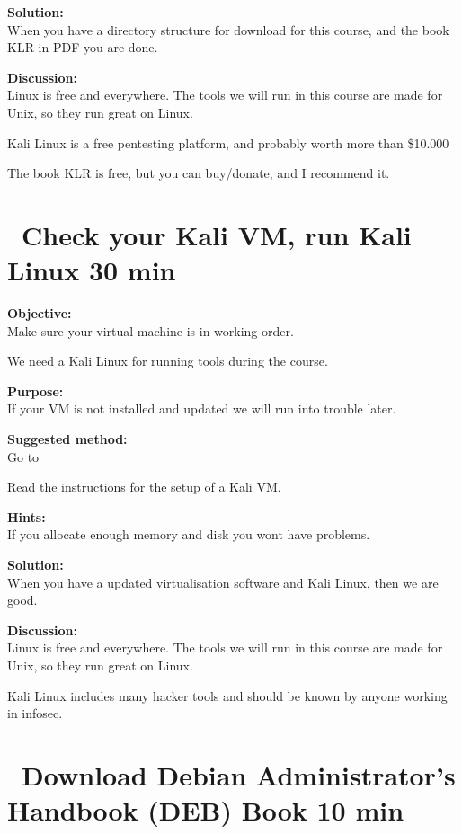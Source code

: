 \documentclass[a4paper,11pt,notitlepage]{report}
\begin{document}
{\bf Solution:}\\
When you have a directory structure for download for this course, and the book KLR in PDF you are done.

{\bf Discussion:}\\
Linux is free and everywhere. The tools we will run in this course are made for Unix, so they run great on Linux.

Kali Linux is a free pentesting platform, and probably worth more than \$10.000

The book KLR is free, but you can buy/donate, and I recommend it.

\chapter{\faExclamationTriangle\ Check your Kali VM, run Kali Linux 30 min}
\label{ex:basicKaliVM}


{\bf Objective:}\\
Make sure your virtual machine is in working order.

We need a Kali Linux for running tools during the course.

{\bf Purpose:}\\
If your VM is not installed and updated we will run into trouble later.

{\bf Suggested method:}\\
Go to 

Read the instructions for the setup of a Kali VM.

{\bf Hints:}\\
If you allocate enough memory and disk you wont have problems.

{\bf Solution:}\\
When you have a updated virtualisation software and Kali Linux, then we are good.

{\bf Discussion:}\\
Linux is free and everywhere. The tools we will run in this course are made for Unix, so they run great on Linux.

Kali Linux includes many hacker tools and should be known by anyone working in infosec.


\chapter{\faInfoCircle\ Download Debian Administrator’s Handbook (DEB) Book 10 min}
\label{ex:sw-downloadDEB}
\end{document}
